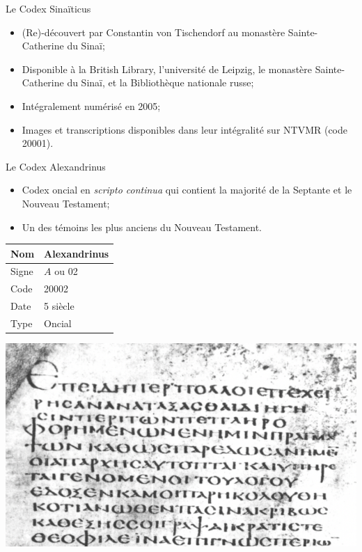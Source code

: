 \documentclass[11pt]{beamer}
\begin{document}
\begin{frame}{Le Codex Sinaïticus}
    \begin{itemize}
        \item (Re)-découvert par Constantin von Tischendorf au monastère Sainte-Catherine du Sinaï; 
        \item Disponible à la British Library, l'université de Leipzig, le monastère Sainte-Catherine du Sinaï, et la Bibliothèque nationale russe;
        \item Intégralement numérisé en 2005;
        \item Images et transcriptions disponibles dans leur intégralité sur NTVMR (code 20001).
    \end{itemize}
\end{frame}


\begin{frame}{Le Codex Alexandrinus}
\begin{block}{}
    \begin{itemize}
        \item Codex oncial en \textit{scripto continua} qui contient la majorité de la Septante et le Nouveau Testament;
        \item Un des témoins les plus anciens du Nouveau Testament.
    \end{itemize}
\end{block}
    \vfill


\begin{minipage}{.45\textwidth}
\begin{tabular}{l|l}
     Nom & Alexandrinus \\
     \hline
     Signe & $A$ ou 02 \\
     \hline
     Code & 20002\\
     \hline
     Date & 5\ieme{} siècle \\
     \hline
     Type & Oncial \\
\end{tabular}
\end{minipage}
\hfill
\begin{minipage}{.45\textwidth}
    \includegraphics[scale=.4]{img/alexandrinus_lk_11.png}
\end{minipage}

\end{frame}
\end{document}
